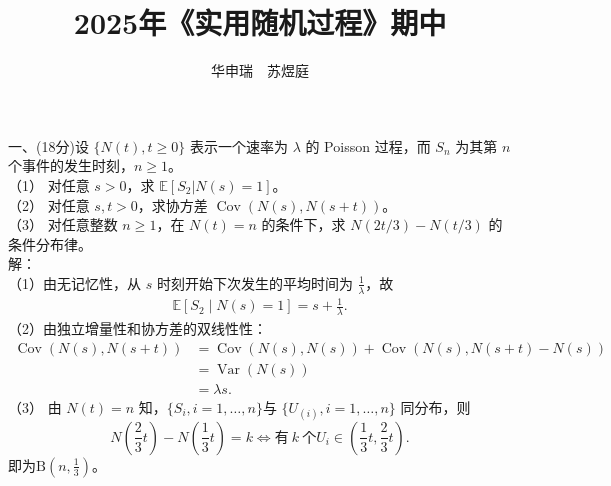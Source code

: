 \documentclass[UTF8]{ctexart}
\title{2025年《实用随机过程》期中}
\author{华申瑞\ \ 苏煜庭}
\date{}
\begin{document}
\maketitle


\noindent 一、(18分)设 $\{N(t), t \geq 0\}$ 表示一个速率为 $\lambda$ 的 Poisson 过程，而 $S_n$ 为其第 $n$ 个事件的发生时刻，$n \geq 1$。\\
（1） 对任意 $s > 0$，求 $\mathbb{E}[S_2|N(s) = 1]$。\\
（2） 对任意 $s, t > 0$，求协方差 $\operatorname{Cov}(N(s), N(s + t))$。\\
（3） 对任意整数 $n \geq 1$，在 $N(t) = n$ 的条件下，求 $N(2t/3) - N(t/3)$ 的条件分布律。\\
解：\\
\qquad （1）由无记忆性，从 $s$ 时刻开始下次发生的平均时间为 $\displaystyle \frac{1}{\lambda}$，故
\begin{align*}
	\mathbb{E}[S_2 \mid N(s)=1]= s+\frac{1}{\lambda}.
\end{align*}
（2）由独立增量性和协方差的双线性性：
\begin{align*}
	\operatorname{Cov}(N(s),N(s+t)) &= \operatorname{Cov}(N(s),N(s))+\operatorname{Cov}(N(s),N(s+t)-N(s))\\
	&= \operatorname{Var}(N(s))\\
	&= \lambda s.
\end{align*}
（3）
由 $N(t)=n$ 知，$\{S_i,i=1,\dots,n\}$与 $\{U_{(i)},i=1,\dots,n\}$ 同分布，则
$$N(\frac{2}{3}t)-N(\frac{1}{3}t)=k \iff \text{有}\ k\ \text{个}U_i\in(\frac{1}{3}t,\frac{2}{3}t).$$
即为$\displaystyle \mathrm{B}(n,\frac{1}{3})$。\\
\end{document}
